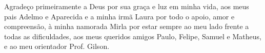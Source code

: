 Agradeço primeiramente a Deus por sua graça e luz em minha vida, aos meus pais Adelmo e Aparecida e a minha irmã Laura por todo o apoio, amor e compreensão, à minha namorada Mirla por estar sempre ao meu lado frente a todas as dificuldades, aos meus queridos amigos Paulo, Felipe, Samuel e Matheus, e ao meu orientador Prof. Gilson.